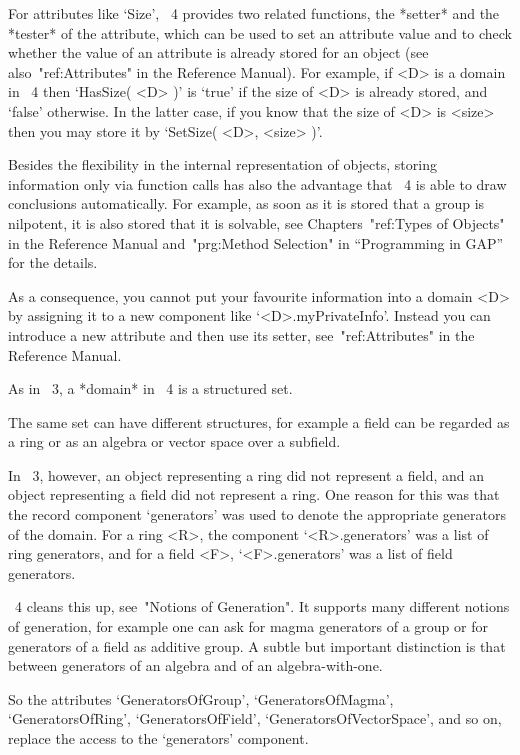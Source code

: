 For attributes like `Size', {\GAP}~4 provides two related functions,
the *setter* and the *tester* of the attribute, which can be used to
set an attribute value and to check whether the value of an attribute
is already stored for an object (see also~"ref:Attributes" in
the Reference Manual).
For example, if <D> is a domain in {\GAP}~4 then `HasSize( <D> )'
is `true' if the size of <D> is already stored, and `false' otherwise.
In the latter case, if you know that the size of <D> is <size> then you
may store it by `SetSize( <D>, <size> )'.

Besides the flexibility in the internal representation of objects,
storing information only via function calls has also the advantage that
{\GAP}~4 is able to draw conclusions automatically.
For example, as soon as it is stored that a group is nilpotent, it is
also stored that it is solvable, see Chapters~"ref:Types of Objects" in the
Reference Manual 
and~"prg:Method Selection" in ``Programming in GAP'' for the details.

As a consequence, you cannot put your favourite information into a
domain <D> by assigning it to a new component like `<D>.myPrivateInfo'.
Instead you can introduce a new attribute and then use its setter,
see~"ref:Attributes" in the Reference Manual.



As in {\GAP}~3, a *domain* in {\GAP}~4 is a structured set.

The same set can have different structures, for example a field can be
regarded as a ring or as an algebra or vector space over a subfield.

In {\GAP}~3, however, an object representing a ring did not represent a
field, and an object representing a field did not represent a ring.
One reason for this was that the record component `generators' was used
to denote the appropriate generators of the domain.
For a ring <R>, the component `<R>.generators' was a list of ring
generators, and for a field <F>, `<F>.generators' was a list of field
generators.

{\GAP}~4 cleans this up, see~"Notions of Generation".
It supports many different notions of generation,
for example one can ask for magma generators of a group
or for generators of a field as additive group.
A subtle but important distinction is that between generators of an
algebra and of an algebra-with-one.

So the attributes `GeneratorsOfGroup', `GeneratorsOfMagma',
`GeneratorsOfRing', `GeneratorsOfField', `GeneratorsOfVectorSpace',
and so on, replace the access to the `generators' component.


